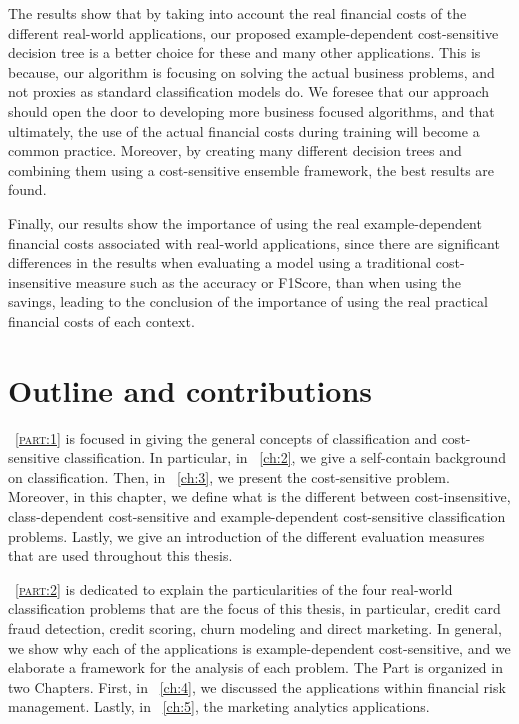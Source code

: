   The results show that by taking into account the real financial costs of the different 
  real-world applications, our  proposed example-dependent cost-sensitive decision tree is a better 
  choice for these and many other applications. This is because, our algorithm is focusing on 
  solving the actual business problems,  and not proxies as standard classification models do. We 
  foresee that our approach should open the door to developing more business focused algorithms, 
  and  that ultimately, the use of the actual financial costs during training will become a common 
  practice. Moreover, by creating many different decision trees and combining them using a 
  cost-sensitive ensemble framework, the best results are found.

  Finally, our results show the importance of using the real example-dependent financial costs 
  associated with real-world applications, since there are significant differences in the 
  results when evaluating a model using a traditional cost-insensitive measure such as the 
  accuracy or F1Score,  than when using the savings, leading to the conclusion of the 
  importance of using the real practical financial costs of each context.

\newpage
\section{Outline and contributions}

\partname{~\textsc{\ref{part:1}}} is focused in giving the general concepts of classification 
and cost-sensitive classification. In particular, in \chaptername{~\ref{ch:2}}, we give a 
self-contain background on classification. Then, in \chaptername{~\ref{ch:3}}, we present the 
cost-sensitive problem. Moreover, in this chapter, we define what is the different between 
cost-insensitive, class-dependent cost-sensitive and example-dependent cost-sensitive 
classification problems. Lastly, we give an introduction of the different evaluation measures 
that are used throughout this thesis.

\partname{~\textsc{\ref{part:2}}} is dedicated to explain the particularities of the four 
real-world classification problems that are the focus of this thesis, in particular, credit card 
fraud detection, credit scoring, churn modeling and direct marketing. In general, we show why each 
of the applications is example-dependent cost-sensitive, and we elaborate a framework for the 
analysis of each problem. The Part is organized in two Chapters. First, in 
\chaptername{~\ref{ch:4}}, we discussed the applications within financial risk management. Lastly, 
in  \chaptername{~\ref{ch:5}}, the marketing analytics applications.

